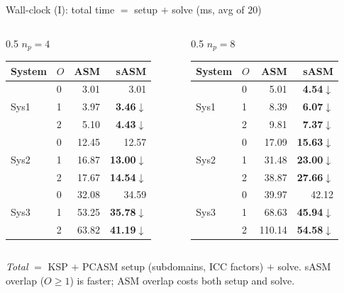 \documentclass[aspectratio=169,11pt]{beamer}
\newcommand{\dn}{\textcolor{good}{$\downarrow$}}
\begin{document}
\begin{frame}{Wall-clock (I): total time $=$ setup $+$ solve (ms, avg of $20$)}
\begin{columns}[T]
\begin{column}{0.5\textwidth}
\centering $n_p=4$\\[0.2em]
\begin{table}\scriptsize
\begin{tabular}{@{}llrr@{}}
\toprule
System & $O$ & ASM & sASM \\
\midrule
\multirow{3}{*}{Sys1}&0&3.01&3.01\\&1&3.97&\textbf{3.46}\dn\\&2&5.10&\textbf{4.43}\dn\\
\midrule
\multirow{3}{*}{Sys2}&0&12.45&12.57\\&1&16.87&\textbf{13.00}\dn\\&2&17.67&\textbf{14.54}\dn\\
\midrule
\multirow{3}{*}{Sys3}&0&32.08&34.59\\&1&53.25&\textbf{35.78}\dn\\&2&63.82&\textbf{41.19}\dn\\
\bottomrule
\end{tabular}
\end{table}
\end{column}
\begin{column}{0.5\textwidth}
\centering $n_p=8$\\[0.2em]
\begin{table}\scriptsize
\begin{tabular}{@{}llrr@{}}
\toprule
System & $O$ & ASM & sASM \\
\midrule
\multirow{3}{*}{Sys1}&0&5.01&\textbf{4.54}\dn\\&1&8.39&\textbf{6.07}\dn\\&2&9.81&\textbf{7.37}\dn\\
\midrule
\multirow{3}{*}{Sys2}&0&17.09&\textbf{15.63}\dn\\&1&31.48&\textbf{23.00}\dn\\&2&38.87&\textbf{27.66}\dn\\
\midrule
\multirow{3}{*}{Sys3}&0&39.97&42.12\\&1&68.63&\textbf{45.94}\dn\\&2&110.14&\textbf{54.58}\dn\\
\bottomrule
\end{tabular}
\end{table}
\end{column}
\end{columns}
\vspace{0.2em}
\footnotesize \emph{Total} $=$ KSP $+$ PCASM setup (subdomains, ICC factors) $+$ solve. sASM overlap ($O{\ge}1$) is faster; ASM overlap costs both setup and solve.
\end{frame}
\end{document}
